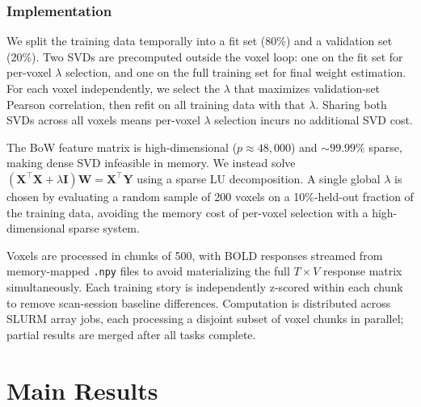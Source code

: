 \subsubsection{Implementation}

We split the training data temporally into a fit set (80\%) and a validation set
(20\%).  Two SVDs are precomputed outside the voxel loop: one on the fit set for
per-voxel $\lambda$ selection, and one on the full training set for final weight
estimation.  For each voxel independently, we select the $\lambda$ that maximizes
validation-set Pearson correlation, then refit on all training data with that
$\lambda$.  Sharing both SVDs across all voxels means per-voxel $\lambda$
selection incurs no additional SVD cost.



The BoW feature matrix is high-dimensional ($p \approx 48{,}000$) and
${\sim}99.99\%$ sparse, making dense SVD infeasible in memory.  We instead
solve $(\bm{X}^\top\bm{X} + \lambda\bm{I})\bm{W} = \bm{X}^\top\bm{Y}$
using a sparse LU decomposition.  A single global $\lambda$ is chosen by
evaluating a random sample of 200 voxels on a 10\%-held-out fraction of the
training data, avoiding the memory cost of per-voxel selection with a
high-dimensional sparse system.



Voxels are processed in chunks of 500, with BOLD responses streamed from
memory-mapped \texttt{.npy} files to avoid materializing the full
$T \times V$ response matrix simultaneously.  Each training story is
independently z-scored within each chunk to remove scan-session baseline
differences.  Computation is distributed across SLURM array jobs, each
processing a disjoint subset of voxel chunks in parallel; partial results are
merged after all tasks complete.

\section{Main Results}

